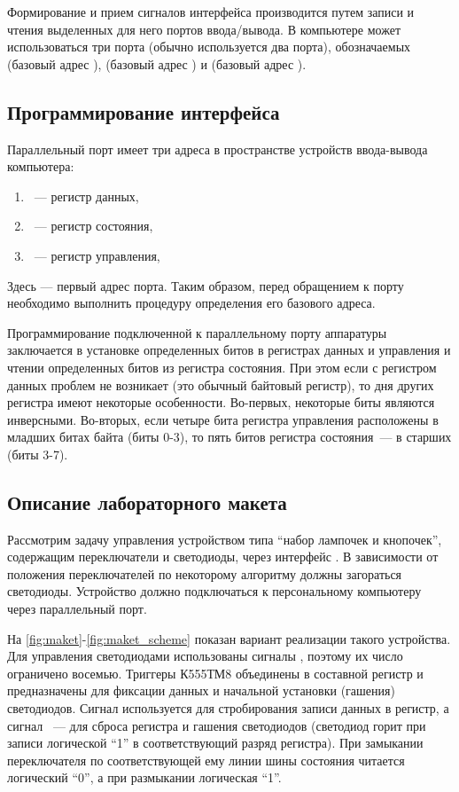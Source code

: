 Формирование и прием сигналов интерфейса  производится путем записи и чтения выделенных для него портов ввода/вывода. В компьютере может использоваться три порта  (обычно используется два порта), обозначаемых  (базовый адрес ),  (базовый адрес ) и  (базовый адрес ).

\subsection{Программирование интерфейса }

Параллельный порт имеет три адреса в пространстве устройств ввода-вывода компьютера:

\begin{enumerate}
    \item {}~--- регистр данных,
    \item {}~--- регистр состояния,
    \item {}~--- регистр управления,
\end{enumerate}

Здесь  — первый адрес порта. Таким образом, перед обращением к порту необходимо выполнить процедуру определения его базового адреса.

Программирование подключенной к параллельному порту аппаратуры заключается в установке определенных битов в регистрах данных и управления и чтении определенных битов из регистра состояния. При этом если с регистром данных проблем не возникает (это обычный байтовый регистр), то дня других регистра имеют некоторые особенности. Во-первых, некоторые биты являются инверсными. Во-вторых, если четыре бита регистра управления расположены в младших битах байта (биты 0-3), то пять битов регистра состояния~--- в старших (биты 3-7).

\subsection{Описание лабораторного макета}

Рассмотрим задачу управления устройством типа \enquote{набор лампочек и кнопочек}, содержащим переключатели и светодиоды, через интерфейс . В зависимости от положения переключателей по некоторому алгоритму должны загораться светодиоды. Устройство должно подключаться к персональному компьютеру через параллельный порт.

На \autoref{fig:maket}-\autoref{fig:maket_scheme} показан вариант реализации такого устройства. Для управления светодиодами использованы сигналы , поэтому их число ограничено восемью. Триггеры К555ТМ8 объединены в составной регистр и предназначены для фиксации данных и начальной установки (гашения) светодиодов. Сигнал  используется для стробирования записи данных в регистр, а сигнал ~--- для сброса регистра и гашения светодиодов (светодиод горит при записи логической \enquote{1} в соответствующий разряд регистра). При замыкании переключателя по соответствующей ему линии шины состояния читается логический \enquote{0}, а при размыкании логическая \enquote{1}.

